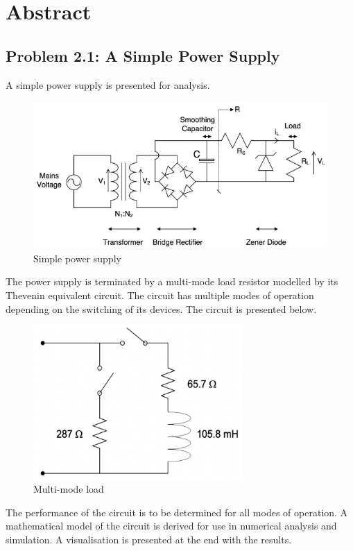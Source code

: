 \section*{Abstract}
\subsection*{Problem 2.1: A Simple Power Supply}
A simple power supply is presented for analysis. 
\begin{figure}[H]
    \centering
    \includegraphics[width=\textwidth]{graphics/powersupply.png}
    \caption{Simple power supply}
    \label{fig:powersupply}
\end{figure}
The power supply is terminated by a multi-mode load resistor modelled by its Thevenin equivalent circuit. The circuit has multiple modes of operation depending on the switching of its devices. The circuit is presented below.
\begin{figure}[H]
    \centering
    \includegraphics[width=8cm]{graphics/multimode_load.png}
    \caption{Multi-mode load}
    \label{fig:multimode_load}
\end{figure}
The performance of the circuit is to be determined for all modes of operation. A mathematical model of the circuit is derived for use in numerical analysis and simulation. A visualisation is presented at the end with the results.